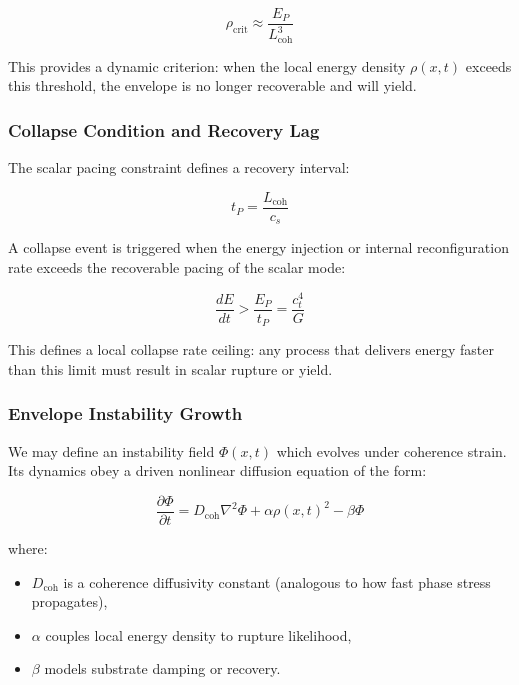 \documentclass[entropy,article,submit,pdftex,moreauthors]{Definitions/mdpi}
\begin{document}
\begin{equation}
\rho_{\text{crit}} \approx \frac{E_P}{L_{\text{coh}}^3}
\end{equation}

This provides a dynamic criterion: when the local energy density $\rho(x,t)$ exceeds this threshold, the envelope is no longer recoverable and will yield.

\subsubsection{Collapse Condition and Recovery Lag}

The scalar pacing constraint defines a recovery interval:

\begin{equation}
t_P = \frac{L_{\text{coh}}}{c_s}
\end{equation}

A collapse event is triggered when the energy injection or internal reconfiguration rate exceeds the recoverable pacing of the scalar mode:

\begin{equation}
\frac{dE}{dt} > \frac{E_P}{t_P} = \frac{c_t^4}{G}
\end{equation}

This defines a local collapse rate ceiling: any process that delivers energy faster than this limit must result in scalar rupture or yield.

\subsubsection{Envelope Instability Growth}

We may define an instability field $\Phi(x,t)$ which evolves under coherence strain. Its dynamics obey a driven nonlinear diffusion equation of the form:

\begin{equation}
\frac{\partial \Phi}{\partial t} = D_{\text{coh}} \nabla^2 \Phi + \alpha \rho(x,t)^2 - \beta \Phi
\end{equation}

where:
\begin{itemize}
  \item $D_{\text{coh}}$ is a coherence diffusivity constant (analogous to how fast phase stress propagates),
  \item $\alpha$ couples local energy density to rupture likelihood,
  \item $\beta$ models substrate damping or recovery.
\end{itemize}
\end{document}
